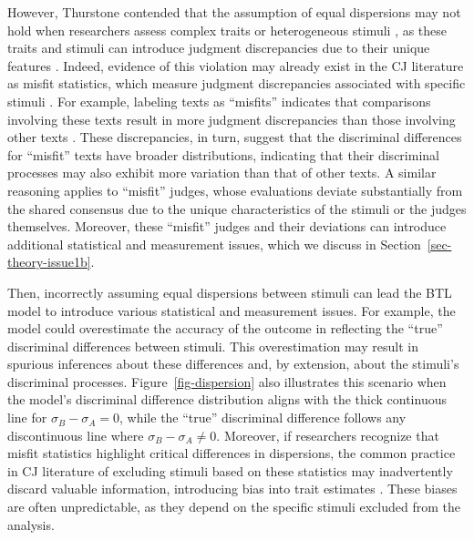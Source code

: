 \documentclass[
  authoryear,
  preprint,
  1p]{elsarticle}
\begin{document}
However, Thurstone contended that the assumption of equal dispersions
may not hold when researchers assess complex traits or heterogeneous
stimuli \citep[pp.~376]{Thurstone_1927a}, as these traits and stimuli
can introduce judgment discrepancies due to their unique features
\citep{vanDaal_et_al_2016, Lesterhuis_2018, Chambers_et_al_2022}.
Indeed, evidence of this violation may already exist in the CJ
literature as misfit statistics, which measure judgment discrepancies
associated with specific stimuli
\citetext{\citealp[pp.~12]{Pollitt_2004}; \citealp[pp.~20]{Goossens_et_al_2018}}.
For example, labeling texts as ``misfits'' indicates that comparisons
involving these texts result in more judgment discrepancies than those
involving other texts
\citep{Pollitt_2012a, Pollitt_2012b, vanDaal_et_al_2016, Goossens_et_al_2018}.
These discrepancies, in turn, suggest that the discriminal differences
for ``misfit'' texts have broader distributions, indicating that their
discriminal processes may also exhibit more variation than that of other
texts. A similar reasoning applies to ``misfit'' judges, whose
evaluations deviate substantially from the shared consensus due to the
unique characteristics of the stimuli or the judges themselves.
Moreover, these ``misfit'' judges and their deviations can introduce
additional statistical and measurement issues, which we discuss in
Section~\ref{sec-theory-issue1b}.

Then, incorrectly assuming equal dispersions between stimuli can lead
the BTL model to introduce various statistical and measurement issues.
For example, the model could overestimate the accuracy of the outcome in
reflecting the ``true'' discriminal differences between stimuli. This
overestimation may result in spurious inferences about these differences
\citep[pp.~370]{McElreath_2020} and, by extension, about the stimuli's
discriminal processes. Figure~\ref{fig-dispersion} also illustrates this
scenario when the model's discriminal difference distribution aligns
with the thick continuous line for \(\sigma_{B}-\sigma_{A}=0\), while
the ``true'' discriminal difference follows any discontinuous line where
\(\sigma_{B}-\sigma_{A} \neq 0\). Moreover, if researchers recognize
that misfit statistics highlight critical differences in dispersions,
the common practice in CJ literature of excluding stimuli based on these
statistics
\citep{Pollitt_2012a, Pollitt_2012b, vanDaal_et_al_2016, Goossens_et_al_2018}
may inadvertently discard valuable information, introducing bias into
trait estimates \citep[chap.~12]{Zimmerman_1994, McElreath_2020}. These
biases are often unpredictable, as they depend on the specific stimuli
excluded from the analysis.
\end{document}
